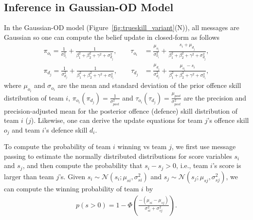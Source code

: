 \documentclass[runningheads,a4paper]{llncs}
\newcommand{\unindentmore}{\hspace{-1.5mm}}
\begin{document}

\subsection{Inference in Gaussian-OD Model}

 In the Gaussian-OD model
(Figure~\ref{fig:trueskill_variant}(N)), all
messages are Gaussian so one can
compute the belief update in closed-form as follows
{\small
\begin{align}
\label{eq:GaussianGraphicalModelsUpdatingEquation}
  \pi_{o_{i}}  =    \frac{1}{\sigma_{o_{i}}^2} + \frac{1}{\beta_1^2+\beta_2^2+\gamma^2+\sigma_{d_{j}}^2}, \qquad \tau_{o_{i}}    &=    \frac{\mu_{o_{i}}}{\sigma_{o_{i}}^2} + \frac{s_i+\mu_{d_{j}}}{\beta_1^2+\beta_2^2+\gamma^2+\sigma_{d_{j}}^2},  \nonumber \\
  \pi_{d_{j}}  =    \frac{1}{\sigma_{d_{j}}^2} + \frac{1}{\beta_1^2+\beta_2^2+\gamma^2+\sigma_{o_{i}}^2}, \qquad \tau_{d_{j}}    &=    \frac{\mu_{d_{j}}}{\sigma_{d_{j}}^2} + \frac{\mu_{o_{i}}-s_i}{\beta_1^2+\beta_2^2+\gamma^2+\sigma_{o_{i}}^2},
\end{align}}
\unindentmore where $\mu_{o_{i}}$ and $\sigma_{o_{i}}$ are the mean
and standard deviation of the prior offence skill distribution of team
$i$, $\pi_{o_{i}} (\pi_{d_{j}}) = \frac{1}{\sigma_{\mathit{post}}^2}$
and $\tau_{o_{i}} (\tau_{d_{j}}) =
\frac{\mu_{\mathit{post}}}{\sigma_{\mathit{post}}^2}$ are the
precision and precision-adjusted mean for the posterior offence
(defence) skill distribution of team $i$ ($j$).  Likewise, one can
derive the update equations for team $j$'s offence skill $o_j$ and
team $i$'s defence skill $d_i$.

 To compute
the probability of team $i$ winning vs team $j$, we first use message
passing to estimate the normally distributed distributions for score
variables $s_i$ and $s_j$, and then compute the probability that
$s_i-s_j>0$, i.e., team $i$'s score is larger than team $j$'s. Given
$s_i\sim\mathcal{N}(s_i;\mu_{si},\sigma_{si}^2)$ and
$s_j\sim\mathcal{N}(s_j;\mu_{sj},\sigma_{sj}^2)$, we can compute the
winning probability of team $i$ by
\begin{align}
  p(s>0) = 1 - \Phi\left(\frac{-(\mu_{si}-\mu_{sj})}{\sigma_{si}^2+\sigma_{sj}^2}\right).
\end{align}
\end{document}
